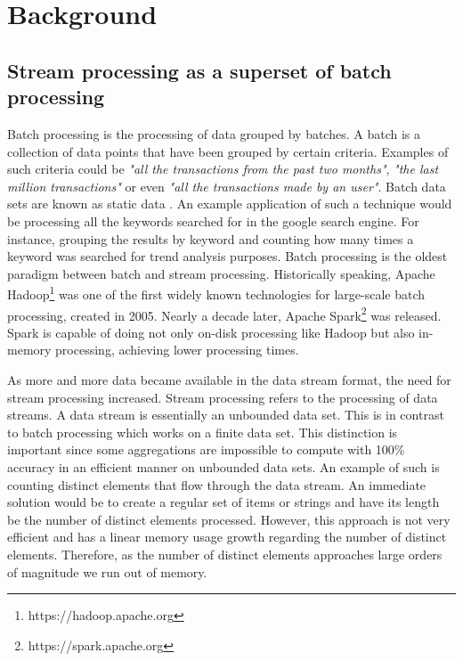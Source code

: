 \chapter{Background}\label{chap:background} \minitoc

\section{Stream processing as a superset of batch processing} \label{sec:stream-superset}

Batch processing is the processing of data grouped by batches. A batch is a collection of data points that have been grouped by certain criteria. Examples of such criteria could be \textit{"all the transactions from the past two months"}, \textit{"the last million transactions"} or even \textit{"all the transactions made by an user"}. Batch data sets are known as static data \cite{Martin-Batch-Defin}. An example application of such a technique would be processing all the keywords searched for in the google search engine. For instance, grouping the results by keyword and counting how many times a keyword was searched for trend analysis purposes. Batch processing is the oldest paradigm between batch and stream processing. Historically speaking, Apache Hadoop\footnote{https://hadoop.apache.org} was one of the first widely known technologies for large-scale batch processing, created in 2005. Nearly a decade later, Apache Spark\footnote{https://spark.apache.org} was released. Spark is capable of doing not only on-disk processing like Hadoop but also in-memory processing, achieving lower processing times. 

As more and more data became available in the data stream format, the need for stream processing increased. Stream processing refers to the processing of data streams. A data stream is essentially an unbounded data set. This is in contrast to batch processing which works on a finite data set. This distinction is important since some aggregations are impossible to compute with 100\% accuracy in an efficient manner on unbounded data sets. An example of such is counting distinct elements that flow through the data stream. An immediate solution would be to create a regular set of items or strings and have its length be the number of distinct elements processed. However, this approach is not very efficient and has a linear memory usage growth regarding the number of distinct elements. Therefore, as the number of distinct elements approaches large orders of magnitude we run out of memory.

